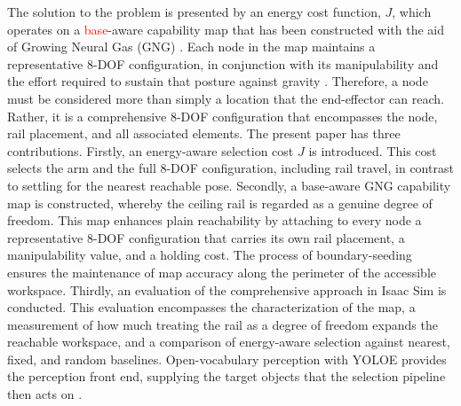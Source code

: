\documentclass[conference]{IEEEtran}
\begin{document}
The solution to the problem is presented by an energy cost function, $J$, 
which operates on a \textcolor{red}{base}-aware capability map that has been constructed
with the aid of Growing Neural Gas (GNG) \cite{Fritzke1995}. Each node in 
the map maintains a representative 8-DOF configuration, in conjunction 
with its manipulability and the effort required to sustain that posture against gravity
\cite{Yoshikawa1985}. Therefore, a node must be considered more than simply 
a location that the end-effector can reach. Rather, it is a comprehensive 8-DOF 
configuration that encompasses the node, rail placement, and all associated elements.
The present paper has three contributions. Firstly, an energy-aware selection 
cost $J$ is introduced. This cost selects the arm and the full 8-DOF configuration, 
including rail travel, in contrast to settling for the nearest reachable pose. 
Secondly, a base-aware GNG capability map is constructed, whereby 
the ceiling rail is regarded as a genuine degree of freedom. 
This map enhances plain reachability by attaching to every node 
a representative 8-DOF configuration that carries its own rail placement,
a manipulability value, and a holding cost. The process of boundary-seeding 
ensures the maintenance of map accuracy along the perimeter of the accessible workspace. 
Thirdly, an evaluation of the comprehensive approach in Isaac Sim is conducted. 
This evaluation encompasses the characterization of the map, a measurement of 
how much treating the rail as a degree of freedom expands the reachable workspace, 
and a comparison of energy-aware selection against nearest, fixed, and random baselines.
Open-vocabulary perception with YOLOE provides the perception front end, supplying the target objects
that the selection pipeline then acts on \cite{Wang2025}.
\end{document}
